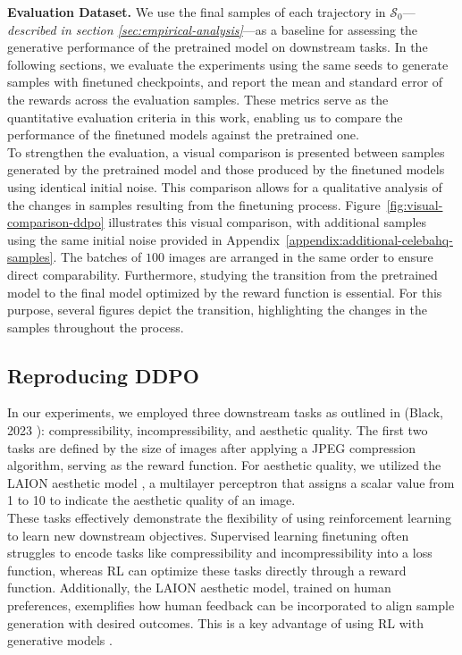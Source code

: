 \noindent \textbf{Evaluation Dataset.} We use the final samples of each trajectory in $\mathcal{S}_{0}$---\textit{described in section \ref{sec:empirical-analysis}}---as a baseline for assessing the generative performance of the pretrained model on downstream tasks. In the following sections, we evaluate the experiments using the same seeds to generate samples with finetuned checkpoints, and report the mean and standard error of the rewards across the evaluation samples. These metrics serve as the quantitative evaluation criteria in this work, enabling us to compare the performance of the finetuned models against the pretrained one. \\


\noindent To strengthen the evaluation, a visual comparison is presented between samples generated by the pretrained model and those produced by the finetuned models using identical initial noise. This comparison allows for a qualitative analysis of the changes in samples resulting from the finetuning process. Figure~\ref{fig:visual-comparison-ddpo} illustrates this visual comparison, with additional samples using the same initial noise provided in Appendix~\ref{appendix:additional-celebahq-samples}. The batches of $100$ images are arranged in the same order to ensure direct comparability. Furthermore, studying the transition from the pretrained model to the final model optimized by the reward function is essential. For this purpose, several figures depict the transition, highlighting the changes in the samples throughout the process. \\


\subsection{Reproducing DDPO}

\noindent In our experiments, we employed three downstream tasks as outlined in (Black, 2023 \cite{black2023training}): compressibility, incompressibility, and aesthetic quality. The first two tasks are defined by the size of images after applying a JPEG compression algorithm, serving as the reward function. For aesthetic quality, we utilized the LAION aesthetic model \citep{laion2022}, a multilayer perceptron that assigns a scalar value from 1 to 10 to indicate the aesthetic quality of an image. \\

\noindent These tasks effectively demonstrate the flexibility of using reinforcement learning to learn new downstream objectives. Supervised learning finetuning often struggles to encode tasks like compressibility and incompressibility into a loss function, whereas RL can optimize these tasks directly through a reward function. Additionally, the LAION aesthetic model, trained on human preferences, exemplifies how human feedback can be incorporated to align sample generation with desired outcomes. This is a key advantage of using RL with generative models \cite{ouyang2022training}. \\

